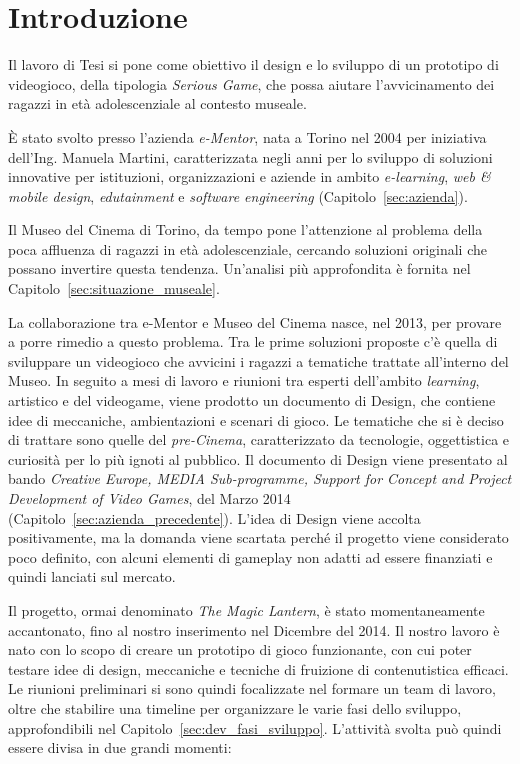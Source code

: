 \chapter{Introduzione}
\label{chap:intro}

Il lavoro di Tesi si pone come obiettivo il design e lo sviluppo di un prototipo di videogioco, della tipologia \textit{Serious Game}, che possa aiutare l’avvicinamento dei ragazzi in età adolescenziale al contesto museale.

È stato svolto presso l’azienda \textit{e-Mentor}, nata a Torino nel 2004 per iniziativa dell’Ing. Manuela Martini, caratterizzata negli anni per lo sviluppo di soluzioni innovative per istituzioni, organizzazioni e aziende in ambito \textit{e-learning}, \textit{web \& mobile design}, \textit{edutainment} e \textit{software engineering} (Capitolo~\ref{sec:azienda}).

Il Museo del Cinema di Torino, da tempo pone l’attenzione al problema della poca affluenza di ragazzi in età adolescenziale, cercando soluzioni originali che possano invertire questa tendenza. Un'analisi più approfondita è fornita nel Capitolo~\ref{sec:situazione_museale}.

La collaborazione tra e-Mentor e Museo del Cinema nasce, nel 2013, per provare a porre rimedio a questo problema.
Tra le prime soluzioni proposte c’è quella di sviluppare un videogioco che avvicini i ragazzi a tematiche trattate all’interno del Museo. In seguito a mesi di lavoro e riunioni tra esperti dell’ambito \textit{learning}, artistico e del videogame, viene prodotto un documento di Design, che contiene idee di meccaniche, ambientazioni e scenari di gioco. Le tematiche che si è deciso di trattare sono quelle del \textit{pre-Cinema}, caratterizzato da tecnologie, oggettistica e curiosità per lo più ignoti al pubblico.
Il documento di Design viene presentato al bando \textit{Creative Europe, MEDIA Sub-programme, Support for Concept and Project Development of Video Games}, del Marzo 2014 (Capitolo~\ref{sec:azienda_precedente}).
L’idea di Design viene accolta positivamente, ma la domanda viene scartata perché il progetto viene considerato poco definito, con alcuni elementi di gameplay non adatti ad essere finanziati e quindi lanciati sul mercato.

Il progetto, ormai denominato \textit{The Magic Lantern}, è stato momentaneamente accantonato, fino al nostro inserimento nel Dicembre del 2014.
Il nostro lavoro è nato con lo scopo di creare un prototipo di gioco funzionante, con cui poter testare idee di design, meccaniche e tecniche di fruizione di contenutistica efficaci.
Le riunioni preliminari si sono quindi focalizzate nel formare un team di lavoro, oltre che stabilire una timeline per organizzare le varie fasi dello sviluppo, approfondibili nel Capitolo~\ref{sec:dev_fasi_sviluppo}.
L’attività svolta può quindi essere divisa in due grandi momenti:

